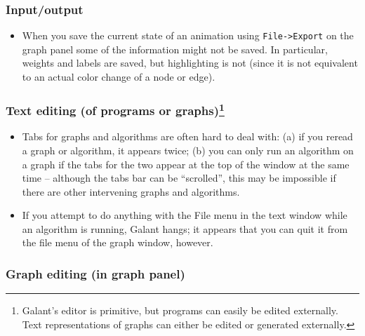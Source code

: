 
\subsubsection*{Input/output}

\begin{itemize}

\item
When you save the current state of an animation using \texttt{File->Export}
on the graph panel some of the information might not be saved.
In particular, weights and labels are saved, but highlighting is not (since it is not equivalent to an actual color change of a node or edge).

\end{itemize}

\subsubsection*{Text editing (of programs or graphs)\footnote{
Galant's editor  is primitive, but
programs can easily be edited externally.
Text representations of graphs can either be edited or generated externally.}}

\begin{itemize}

\item
Tabs for graphs and algorithms are often hard to deal with: (a) if you reread
a graph or algorithm, it appears twice; (b) you can only run an algorithm on a graph if the tabs for the two appear at the top of the window at the same time
-- although the tabs bar can be ``scrolled'',
this may be impossible if there are other intervening graphs and algorithms.

\item If you attempt to do anything with the File menu in the text window
  while an algorithm is running, Galant hangs; it appears that you can quit it from
the file menu of the graph window, however.

\end{itemize}

\subsubsection*{Graph editing (in graph panel)}

